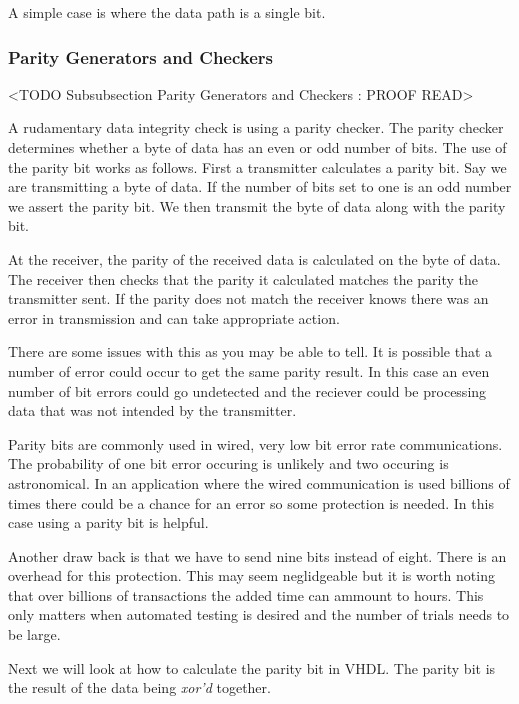 A simple case is where the data path is a single bit. 

\subsubsection{Parity Generators and Checkers}
	<TODO Subsubsection  Parity Generators and Checkers : PROOF READ>
	
A rudamentary data integrity check is using a parity checker. The parity checker determines whether a byte of data has an even or odd number of bits. The use of the parity bit works as follows. First a transmitter calculates a parity bit. Say we are transmitting a byte of data. If the number of bits set to one is an odd number we assert the parity bit. We then transmit the byte of data along with the parity bit. 

At the receiver, the parity of the received data is calculated on the byte of data. The receiver then checks that the parity it calculated matches the parity the transmitter sent. If the parity does not match the receiver knows there was an error in transmission and can take appropriate action.

There are some issues with this as you may be able to tell. It is possible that a number of error could occur to get the same parity result. In this case an even number of bit errors could go undetected and the reciever could be processing data that was not intended by the transmitter. 

Parity bits are commonly used in wired, very low bit error rate communications. The probability of one bit error occuring is unlikely and two occuring is astronomical. In an application where the wired communication is used billions of times there could be a chance for an error so some protection is needed. In this case using a parity bit is helpful. 

Another draw back is that we have to send nine bits instead of eight. There is an overhead for this protection. This may seem neglidgeable but it is worth noting that over billions of transactions the added time can ammount to hours. This only matters when automated testing is desired and the number of trials needs to be large. 

Next we will look at how to calculate the parity bit in \ac{VHDL}. The parity bit is the result of the data being \emph{xor'd} together.

